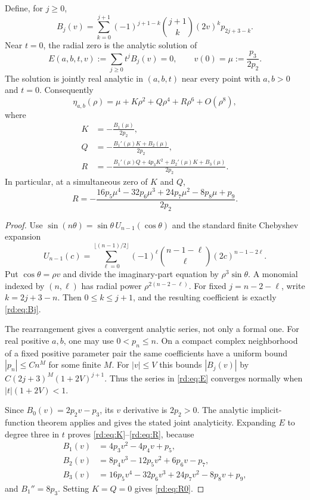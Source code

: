 \begin{lemma}
\label{rd:lem:allorders}
Define, for $j\ge0$,
\begin{equation}\label{rd:eq:Bj}
 B_j(v)=\sum_{k=0}^{j+1}(-1)^{j+1-k}\binom{j+1}{k}
                   (2v)^k p_{2j+3-k}.
\end{equation}
Near $t=0$, the radial zero is the analytic solution of
\begin{equation}\label{rd:eq:E}
 E(a,b,t,v):=\sum_{j\ge0}t^jB_j(v)=0,
 \qquad v(0)=\mu:=\frac{p_3}{2p_2}.
\end{equation}
The solution is jointly real analytic in $(a,b,t)$ near every point
with $a,b>0$ and $t=0$. Consequently
\begin{equation}\label{rd:eq:expansion}
 \eta_{a,b}(\rho)=\mu+K\rho^2+Q\rho^4+R\rho^6+O(\rho^8),
\end{equation}
where
\begin{align}
 K&=-\frac{B_1(\mu)}{2p_2},\label{rd:eq:K}\\
 Q&=-\frac{B_1'(\mu)K+B_2(\mu)}{2p_2},\label{rd:eq:Q}\\
 R&=-\frac{B_1'(\mu)Q+4p_3K^2+B_2'(\mu)K+B_3(\mu)}{2p_2}.
 \label{rd:eq:R}
\end{align}
In particular, at a simultaneous zero of $K$ and $Q$,
\begin{equation}\label{rd:eq:R0}
 R=-\frac{16p_5\mu^4-32p_6\mu^3+24p_7\mu^2-8p_8\mu+p_9}
          {2p_2}.
\end{equation}
\end{lemma}

\begin{proof}
Use $\sin(n\theta)=\sin\theta\,U_{n-1}(\cos\theta)$ and
the standard finite Chebyshev expansion~\cite{rd:DLMFChebyshev}
\[
 U_{n-1}(c)=\sum_{\ell=0}^{\lfloor(n-1)/2\rfloor}
   (-1)^\ell\binom{n-1-\ell}{\ell}(2c)^{n-1-2\ell}.
\]
Put $\cos\theta=\rho v$ and divide the imaginary-part equation by
$\rho^3\sin\theta$. A monomial indexed by $(n,\ell)$ has radial
power $\rho^{2(n-2-\ell)}$. For fixed $j=n-2-\ell$, write
$k=2j+3-n$. Then $0\le k\le j+1$, and the resulting coefficient
is exactly \eqref{rd:eq:Bj}.

The rearrangement gives a convergent analytic series, not only a formal
one. For real positive $a,b$, one may use $0<p_n\le n$. On a compact
complex neighborhood of a fixed positive parameter pair the same
coefficients have a uniform bound $|p_n|\le Cn^M$ for some finite $M$.
For $|v|\le V$ this bounds $|B_j(v)|$ by
$C(2j+3)^M(1+2V)^{j+1}$. Thus the series in \eqref{rd:eq:E}
converges normally when $|t|(1+2V)<1$.

Since $B_0(v)=2p_2v-p_3$, its $v$ derivative is $2p_2>0$.
The analytic implicit-function theorem applies and gives the stated
joint analyticity. Expanding $E$ to degree three in $t$ proves
\eqref{rd:eq:K}--\eqref{rd:eq:R}, because
\begin{align*}
 B_1(v)&=4p_3v^2-4p_4v+p_5,\\
 B_2(v)&=8p_4v^3-12p_5v^2+6p_6v-p_7,\\
 B_3(v)&=16p_5v^4-32p_6v^3+24p_7v^2-8p_8v+p_9,
\end{align*}
and $B_1''=8p_3$. Setting $K=Q=0$ gives \eqref{rd:eq:R0}.
\end{proof}


